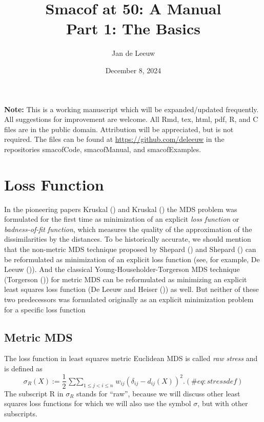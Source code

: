 \documentclass[
  12pt,
  letterpaper,
  DIV=11,
  numbers=noendperiod]{scrartcl}
\title{Smacof at 50: A Manual\\
Part 1: The Basics}
\author{Jan de Leeuw}
\date{December 8, 2024}
\newcommand{\sectionbreak}{\clearpage}
\renewcommand*\contentsname{Table of contents}
\newcommand\contentsname{Table of contents}
\theoremstyle{plain}
\theoremstyle{remark}
\begin{document}
\maketitle

\renewcommand*\contentsname{Table of contents}
{
\hypersetup{linkcolor=}
\setcounter{tocdepth}{3}
\tableofcontents
}

\textbf{Note:} This is a working manuscript which will be
expanded/updated frequently. All suggestions for improvement are
welcome. All Rmd, tex, html, pdf, R, and C files are in the public
domain. Attribution will be appreciated, but is not required. The files
can be found at \url{https://github.com/deleeuw} in the repositories
smacofCode, smacofManual, and smacofExamples.

\sectionbreak

\section{Loss Function}\label{loss-function}

In the pioneering papers Kruskal () and
Kruskal () the MDS problem was
formulated for the first time as minimization of an explicit \emph{loss
function} or \emph{badness-of-fit function}, which measures the quality
of the approximation of the dissimilarities by the distances. To be
historically accurate, we should mention that the non-metric MDS
technique proposed by Shepard () and
Shepard () can be reformulated as
minimization of an explicit loss function (see, for example, De Leeuw
()). And the classical
Young-Householder-Torgerson MDS technique (Torgerson
()) for metric MDS can be reformulated
as minimizing an explicit least squares loss function (De Leeuw and
Heiser ()) as well. But neither
of these two predecessors was formulated originally as an explicit
minimization problem for a specific loss function

\subsection{Metric MDS}\label{metric-mds}

The loss function in least squares metric Euclidean MDS is called
\emph{raw stress} and is defined as \begin{equation}
\sigma_R(X):=\frac12\mathop{\sum\sum}_{1\leq j<i\leq n}w_{ij}(\delta_{ij}-d_{ij}(X))^2.
(\#eq:stressdef)
\end{equation} The subscript R in \(\sigma_R\) stands for ``raw'',
because we will discuss other least squares loss functions for which we
will also use the symbol \(\sigma\), but with other subscripts.
\end{document}
